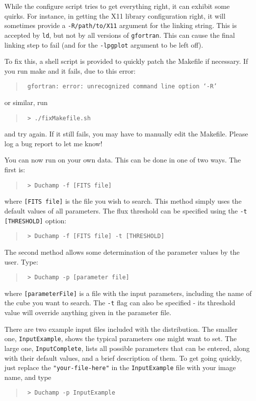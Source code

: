 
While the configure script tries to get everything right, it can
exhibit some quirks. For instance, in getting the X11 library
configuration right, it will sometimes provide a
\texttt{-R/path/to/X11} argument for the linking string. This is
accepted by \texttt{ld}, but not by all versions of \texttt{gfortran}.
This can cause the final linking step to fail (and for the
\texttt{-lpgplot} argument to be left off).

To fix this, a shell script is provided to quickly patch the Makefile
if necessary. If you run make and it fails, due to this error:
\begin{quote}
{\footnotesize
\texttt{%
   gfortran: error: unrecognized command line option ‘-R’}
}
\end{quote}
 or similar, run 
\begin{quote}
{\footnotesize
\texttt{%
 > ./fixMakefile.sh}
}
\end{quote}
and try again. If it still fails, you may have to manually edit the
Makefile. Please log a bug report to let me know!



You can now run \duchamp on your own data. This can be done in one
of two ways. The first is:
\begin{quote}
{\footnotesize
\verb| > Duchamp -f [FITS file]|
}
\end{quote}
where \texttt{[FITS file]} is the file you wish to search. This method
simply uses the default values of all parameters. The flux threshold
can be specified using the \texttt{-t [THRESHOLD]} option:
\begin{quote}
{\footnotesize
\verb| > Duchamp -f [FITS file] -t [THRESHOLD]|
}
\end{quote}

The second method allows some determination of the parameter values by
the user. Type:
\begin{quote}
{\footnotesize
\verb| > Duchamp -p [parameter file]|
}
\end{quote}
where \texttt{[parameterFile]} is a file with the input parameters,
including the name of the cube you want to search. The \texttt{-t}
flag can also be specified - its threshold value will override
anything given in the parameter file.

There are two example input files included with the distribution. The
smaller one, \texttt{InputExample}, shows the typical parameters one
might want to set. The large one, \texttt{InputComplete}, lists all
possible parameters that can be entered, along with their default
values, and a brief description of them. To get going quickly, just
replace the \texttt{"your-file-here"} in the \texttt{InputExample}
file with your image name, and type
\begin{quote}
{\footnotesize
\verb| > Duchamp -p InputExample|
}
\end{quote}

